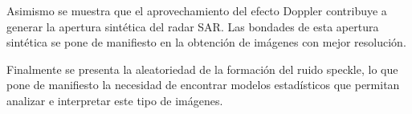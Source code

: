 Asimismo se muestra que el aprovechamiento del efecto Doppler contribuye a generar la apertura sintética del radar SAR. Las bondades de esta apertura sintética se pone de manifiesto en la obtención de imágenes con  mejor resolución.

Finalmente se presenta la aleatoriedad de la formación del ruido speckle, lo que pone de manifiesto la necesidad de encontrar modelos estadísticos que permitan analizar e interpretar este tipo de imágenes.

%

%
%

